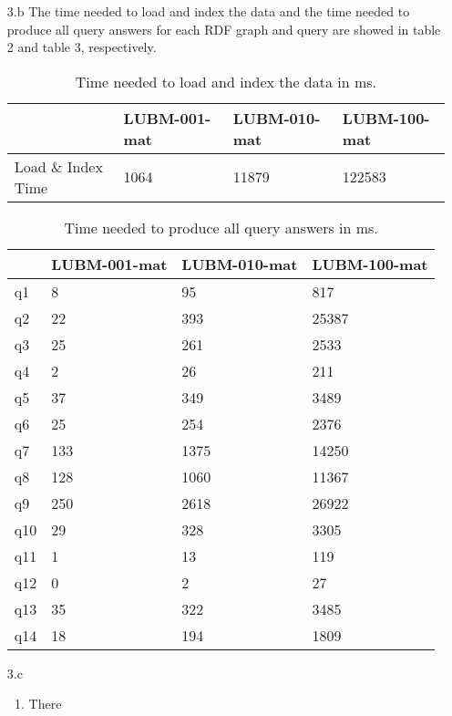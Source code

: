 \documentclass{article}
\begin{document}
\begin{enumerate}
\begin{enumerate}
\end{enumerate}

\item[3.b] The time needed to load and index the data and the time needed to produce all query answers for each RDF graph and query are showed in table 2 and table 3, respectively.

\begin{table}[H]\centering
\begin{tabular}{|l|l|l|l|}
\hline
                   & LUBM-001-mat & LUBM-010-mat & LUBM-100-mat \\ \hline
Load \& Index Time & 1064         & 11879        & 122583       \\ \hline
\end{tabular}
\caption{Time needed to load and index the data in ms.}
\end{table}



\begin{table}[H]\centering
\begin{tabular}{|l|l|l|l|}
\hline
    & LUBM-001-mat & LUBM-010-mat & LUBM-100-mat \\ \hline
q1  & 8            & 95           & 817          \\ \hline
q2  & 22           & 393          & 25387        \\ \hline
q3  & 25           & 261          & 2533         \\ \hline
q4  & 2            & 26           & 211          \\ \hline
q5  & 37           & 349          & 3489         \\ \hline
q6  & 25           & 254          & 2376         \\ \hline
q7  & 133          & 1375         & 14250        \\ \hline
q8  & 128          & 1060         & 11367        \\ \hline
q9  & 250          & 2618         & 26922        \\ \hline
q10 & 29           & 328          & 3305         \\ \hline
q11 & 1            & 13           & 119          \\ \hline
q12 & 0            & 2            & 27           \\ \hline
q13 & 35           & 322          & 3485         \\ \hline
q14 & 18           & 194          & 1809         \\ \hline
\end{tabular}
\caption{Time needed to produce  all query answers in ms.}
\end{table}

\item[3.c]

\begin{enumerate}
\item There
\end{enumerate}

\end{enumerate}
\end{document}
